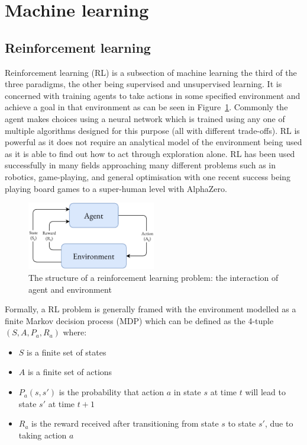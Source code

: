 \section{Machine learning}

\subsection{Reinforcement learning}

Reinforcement learning (RL)\cite{sutton2018reinforcement} is a subsection of machine learning the third of the three paradigms, the other being supervised and unsupervised learning. It is concerned with training agents to take actions in some specified environment and achieve a goal in that environment as can be seen in Figure~\ref{fig:reinforcement_learning}. Commonly the agent makes choices using a neural network which is trained using any one of multiple algorithms designed for this purpose (all with different trade-offs). RL is powerful as it does not require an analytical model of the environment being used as it is able to find out how to act through exploration alone. RL has been used successfully in many fields approaching many different problems such as in robotics\cite{gavrilov2011mobile}, game-playing\cite{tesauro1995temporal}, and general optimisation with one recent success being playing board games to a super-human level with AlphaZero\cite{Silver1140}.

\begin{figure}
    \centering
    \includegraphics[width=0.5\textwidth]{figures/reinforcement_learning.pdf}
    \caption{The structure of a reinforcement learning problem: the interaction of agent and environment}
    \label{fig:reinforcement_learning}
\end{figure}

Formally, a RL problem is generally framed with the environment modelled as a finite Markov decision process (MDP) which can be defined as the 4-tuple $(S, A, P_a, R_a)$ where:
\begin{itemize}
    \item $S$ is a finite set of states
    \item $A$ is a finite set of actions
    \item $P_a(s,s')$ is the probability that action $a$ in state $s$ at time $t$ will lead to state $s'$ at time $t + 1$
    \item $R_a$ is the reward received after transitioning from state $s$ to state $s'$, due to taking action $a$
\end{itemize}

